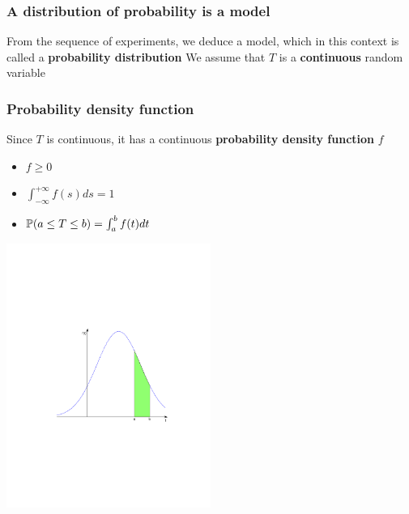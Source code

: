 \documentclass[aspectratio=169]{beamer}
\begin{document}

\begin{frame}\frametitle{A distribution of probability is a model}
From the sequence of experiments, we deduce a model, which in this context is called a \textbf{probability distribution}
\vfill
We assume that $T$ is a \textbf{continuous} random variable
\end{frame}


\begin{frame}\frametitle{Probability density function}
Since $T$ is continuous, it has a continuous \textbf{probability density
function} $f$
\begin{itemize}
\item $f\geq 0$
\item $\int_{-\infty}^{+\infty}f(s)ds=1$
\item $\mathbb{P}(a\leq T\leq b)=\int_a^bf(t)dt$
\end{itemize}
\begin{center}
\includegraphics[width=0.5\textwidth]{FIGS/distrib_a_b}
\end{center}
\end{frame}
\end{document}
